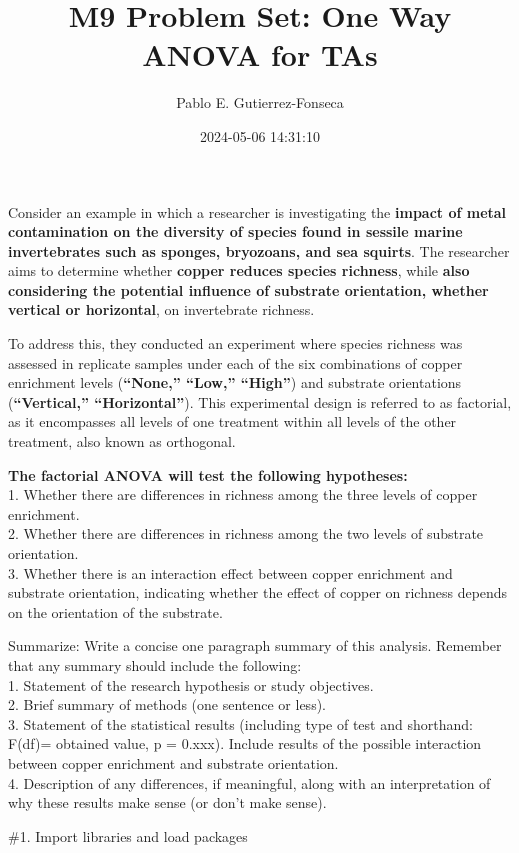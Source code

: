 \documentclass[
]{article}
\title{M9 Problem Set: One Way ANOVA for TAs}
\author{Pablo E. Gutierrez-Fonseca}
\date{2024-05-06 14:31:10}
\begin{document}
\maketitle

Consider an example in which a researcher is investigating the
\textbf{impact of metal contamination on the diversity of species found
in sessile marine invertebrates such as sponges, bryozoans, and sea
squirts}. The researcher aims to determine whether \textbf{copper
reduces species richness}, while \textbf{also considering the potential
influence of substrate orientation, whether vertical or horizontal}, on
invertebrate richness.

To address this, they conducted an experiment where species richness was
assessed in replicate samples under each of the six combinations of
copper enrichment levels (\textbf{``None,'' ``Low,'' ``High''}) and
substrate orientations (\textbf{``Vertical,'' ``Horizontal''}). This
experimental design is referred to as factorial, as it encompasses all
levels of one treatment within all levels of the other treatment, also
known as orthogonal.

\textbf{The factorial ANOVA will test the following hypotheses:}\\
1. Whether there are differences in richness among the three levels of
copper enrichment.\\
2. Whether there are differences in richness among the two levels of
substrate orientation.\\
3. Whether there is an interaction effect between copper enrichment and
substrate orientation, indicating whether the effect of copper on
richness depends on the orientation of the substrate.

Summarize: Write a concise one paragraph summary of this analysis.
Remember that any summary should include the following:\\
1. Statement of the research hypothesis or study objectives.\\
2. Brief summary of methods (one sentence or less).\\
3. Statement of the statistical results (including type of test and
shorthand: F(df)= obtained value, p = 0.xxx). Include results of the
possible interaction between copper enrichment and substrate
orientation.\\
4. Description of any differences, if meaningful, along with an
interpretation of why these results make sense (or don't make sense).

\#1. Import libraries and load packages
\end{document}
